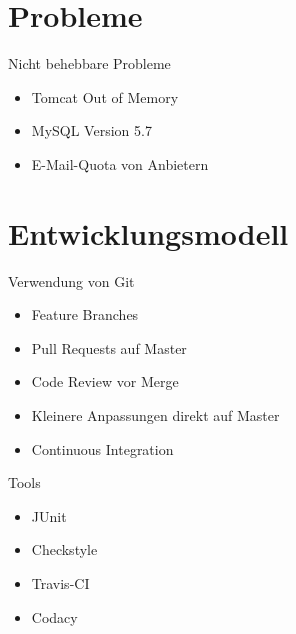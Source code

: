 \documentclass[xcolor=dvipsnames]{beamer}
\begin{document}
\section{Probleme}
\begin{frame}{Nicht behebbare Probleme}
\begin{itemize}
    \item Tomcat Out of Memory
    \item MySQL Version 5.7
    \item E-Mail-Quota von Anbietern
\end{itemize}
\end{frame}

\section{Entwicklungsmodell}
\begin{frame}{Verwendung von Git}
    \begin{itemize}
        \item Feature Branches
        \item Pull Requests auf Master
        \item Code Review vor Merge
        \item Kleinere Anpassungen direkt auf Master
        \item Continuous Integration
    \end{itemize}
\end{frame}

\begin{frame}{Tools}
    \begin{itemize}
        \item JUnit
        \item Checkstyle
        \item Travis-CI
        \item Codacy
    \end{itemize}
\end{frame}
\end{document}

